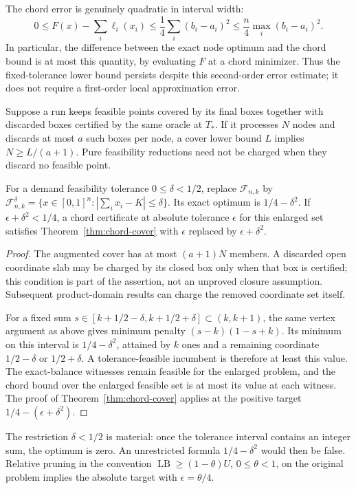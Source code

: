 The chord error is genuinely quadratic in interval width:
\begin{equation}\label{eq:second-order-chord}
 0\le F(x)-\sum_i\ell_i(x_i)
 \le\frac14\sum_i(b_i-a_i)^2
 \le\frac n4\max_i(b_i-a_i)^2.
\end{equation}
In particular, the difference between the exact node optimum and the
chord bound is at most this quantity, by evaluating $F$ at a chord
minimizer. Thus the fixed-tolerance lower bound persists despite this
second-order error estimate; it does not require a first-order local
approximation error.

\begin{proposition}
\label{prop:charged-tolerance}
Suppose a run keeps feasible points covered by its final boxes together
with discarded boxes certified by the same oracle at $T_*$. If it processes
$N$ nodes and discards at most $a$ such boxes per node, a cover lower bound
$L$ implies $N\ge L/(a+1)$. Pure feasibility reductions need not be
charged when they discard no feasible point.

For a demand feasibility tolerance $0\le\delta<1/2$, replace
$\mathcal F_{n,k}$ by
$\mathcal F^\delta_{n,k}=\{x\in[0,1]^n:|\sum_i x_i-K|\le\delta\}$.
Its exact optimum is $1/4-\delta^2$. If
$\epsilon+\delta^2<1/4$, a chord certificate at absolute tolerance
$\epsilon$ for this enlarged set satisfies Theorem~\ref{thm:chord-cover}
with $\epsilon$ replaced by $\epsilon+\delta^2$.
\end{proposition}
\begin{proof}
The augmented cover has at most $(a+1)N$ members. A discarded open
coordinate slab may be charged by its closed box only when that box is
certified; this condition is part of the assertion, not an unproved
closure assumption. Subsequent product-domain results can charge the
removed coordinate set itself.

For a fixed sum $s\in[k+1/2-\delta,k+1/2+\delta]\subset(k,k+1)$,
the same vertex argument as above gives minimum penalty
$(s-k)(1-s+k)$. Its minimum on this interval is
$1/4-\delta^2$, attained by $k$ ones and a remaining coordinate
$1/2-\delta$ or $1/2+\delta$. A tolerance-feasible incumbent is therefore
at least this value. The exact-balance witnesses remain feasible for the
enlarged problem, and the chord bound over the enlarged feasible set is
at most its value at each witness. The proof of
Theorem~\ref{thm:chord-cover} applies at the positive target
$1/4-(\epsilon+\delta^2)$.
\end{proof}
The restriction $\delta<1/2$ is material: once the tolerance interval
contains an integer sum, the optimum is zero. An unrestricted formula
$1/4-\delta^2$ would then be false. Relative pruning in the convention
$\operatorname{LB}\ge(1-\theta)U$, $0\le\theta<1$, on the original
problem implies the absolute target with $\epsilon=\theta/4$.

